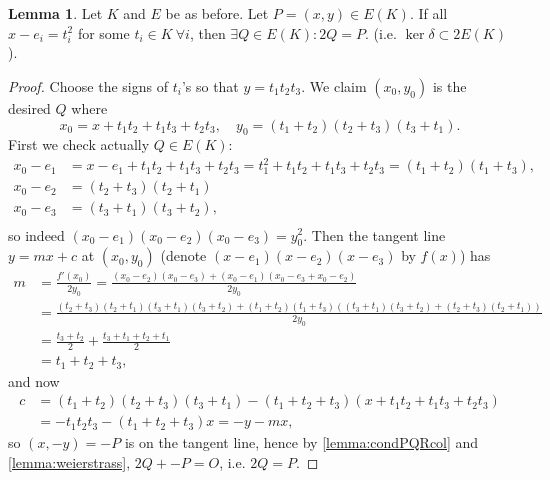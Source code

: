 \documentclass{article}
\theoremstyle{definition}
\newtheorem{lemma}[defn]{Lemma}
\begin{document}
\begin{lemma}
Let $K$ and $E$ be as before. Let $P=(x,y)\in E(K)$. If all $x-e_i=t_i^2$ for some $t_i\in K \ \forall i$, then $\exists Q\in E(K):2Q=P$. (i.e. $\ker\delta\subset 2E(K)$).
\end{lemma}
\begin{proof}
Choose the signs of $t_i$'s so that $y=t_1t_2t_3$. We claim $(x_0,y_0)$ is the desired $Q$ where
\[
x_0=x+t_1t_2+t_1t_3+t_2t_3,\quad y_0=(t_1+t_2)(t_2+t_3)(t_3+t_1).
\]
First we check actually $Q\in E(K)$:
\[
\begin{aligned}
x_0-e_1&=x-e_1+t_1t_2+t_1t_3+t_2t_3=t_1^2+t_1t_2+t_1t_3+t_2t_3=(t_1+t_2)(t_1+t_3),\\
x_0-e_2&=(t_2+t_3)(t_2+t_1) \\
x_0-e_3&=(t_3+t_1)(t_3+t_2), \\
\end{aligned}
\]
so indeed $(x_0-e_1)(x_0-e_2)(x_0-e_3)=y_0^2$. Then the tangent line $y=mx+c$ at $(x_0,y_0)$ (denote $(x-e_1)(x-e_2)(x-e_3)$ by $f(x)$) has
\[
\begin{aligned}
m&=\frac{f'(x_0)}{2y_0}=\frac{(x_0-e_2)(x_0-e_3)+(x_0-e_1)(x_0-e_3+x_0-e_2)}{2y_0}\\
&=\frac{(t_2+t_3)(t_2+t_1)(t_3+t_1)(t_3+t_2)+(t_1+t_2)(t_1+t_3)((t_3+t_1)(t_3+t_2)+(t_2+t_3)(t_2+t_1))}{2y_0}\\
&=\frac{t_3+t_2}{2}+\frac{t_3+t_1+t_2+t_1}{2}\\
&=t_1+t_2+t_3,
\end{aligned}
\]
and now
\[
\begin{aligned}
c&=(t_1+t_2)(t_2+t_3)(t_3+t_1)-(t_1+t_2+t_3)(x+t_1t_2+t_1t_3+t_2t_3)\\
&=-t_1t_2t_3-(t_1+t_2+t_3)x=-y-mx,
\end{aligned}
\]
so $(x,-y)=-P$ is on the tangent line, hence by \ref{lemma:condPQRcol} and \ref{lemma:weierstrass}, $2Q+-P=O$, i.e. $2Q=P$.
\end{proof}
\end{document}

